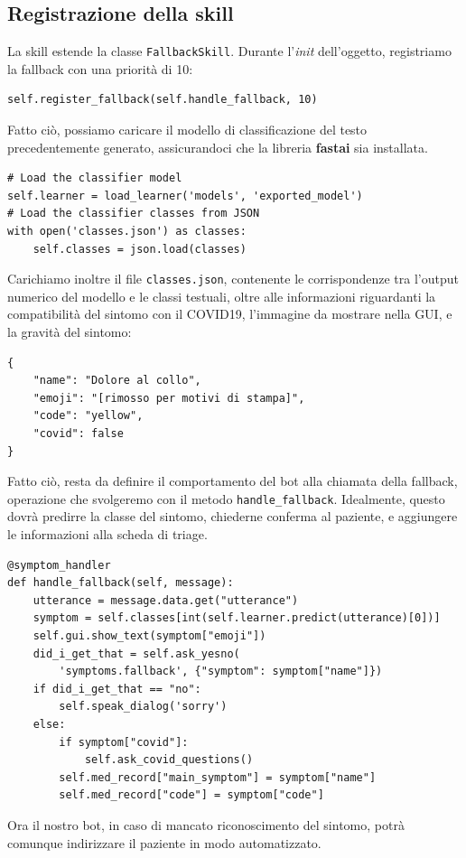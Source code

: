\subsection{Registrazione della skill}
La skill estende la classe \texttt{FallbackSkill}. Durante l'\textit{init} dell'oggetto, registriamo la fallback con una priorità di 10:
\begin{verbatim}
self.register_fallback(self.handle_fallback, 10)
\end{verbatim}
Fatto ciò, possiamo caricare il modello di classificazione del testo precedentemente generato, assicurandoci che la libreria \textbf{fastai} sia installata.
\begin{verbatim}
# Load the classifier model
self.learner = load_learner('models', 'exported_model')
# Load the classifier classes from JSON
with open('classes.json') as classes:
    self.classes = json.load(classes)
\end{verbatim}
Carichiamo inoltre il file \texttt{classes.json}, contenente le corrispondenze tra l'output numerico del modello e le classi testuali, oltre alle informazioni riguardanti la compatibilità del sintomo con il COVID19, l'immagine da mostrare nella GUI, e la gravità del sintomo:
\begin{verbatim}
{
    "name": "Dolore al collo",
    "emoji": "[rimosso per motivi di stampa]",
    "code": "yellow",
    "covid": false
}
\end{verbatim}
Fatto ciò, resta da definire il comportamento del bot alla chiamata della fallback, operazione che svolgeremo con il metodo \texttt{handle\_fallback}.
Idealmente, questo dovrà predirre la classe del sintomo, chiederne conferma al paziente, e aggiungere le informazioni alla scheda di triage.
\begin{verbatim}
@symptom_handler
def handle_fallback(self, message):
    utterance = message.data.get("utterance")
    symptom = self.classes[int(self.learner.predict(utterance)[0])]
    self.gui.show_text(symptom["emoji"])
    did_i_get_that = self.ask_yesno(
        'symptoms.fallback', {"symptom": symptom["name"]})
    if did_i_get_that == "no":
        self.speak_dialog('sorry')
    else:
        if symptom["covid"]:
            self.ask_covid_questions()
        self.med_record["main_symptom"] = symptom["name"]
        self.med_record["code"] = symptom["code"]
\end{verbatim}
Ora il nostro bot, in caso di mancato riconoscimento del sintomo, potrà comunque indirizzare il paziente in modo automatizzato.